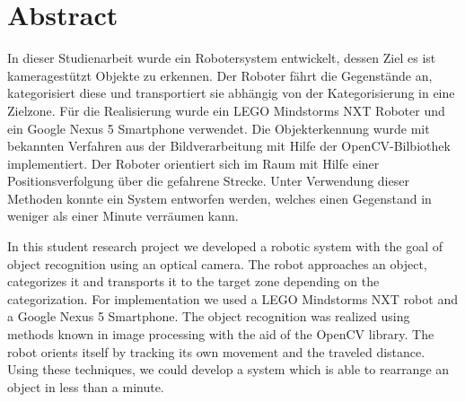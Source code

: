 \chapter*{Abstract}

In dieser Studienarbeit wurde ein Robotersystem entwickelt, dessen Ziel es ist kameragestützt Objekte zu erkennen. Der Roboter fährt die Gegenstände an, kategorisiert diese und transportiert sie abhängig von der Kategorisierung in eine Zielzone. Für die Realisierung wurde ein LEGO Mindstorms NXT Roboter und ein Google Nexus 5 Smartphone verwendet. Die Objekterkennung wurde mit bekannten Verfahren aus der Bildverarbeitung mit Hilfe der OpenCV-Bilbiothek implementiert. Der Roboter orientiert sich im Raum mit Hilfe einer Positionsverfolgung über die gefahrene Strecke. Unter Verwendung dieser Methoden konnte ein System entworfen werden, welches einen Gegenstand in weniger als einer Minute verräumen kann.

In this student research project we developed a robotic system with the goal of object recognition using an optical camera. The robot approaches an object, categorizes it and transports it to the target zone depending on the categorization. For implementation we used a LEGO Mindstorms NXT robot and a Google Nexus 5 Smartphone. The object recognition was realized using methods known in image processing with the aid of the OpenCV library. The robot orients itself by tracking its own movement and the traveled distance. Using these techniques, we could develop a system which is able to rearrange an object in less than a minute.